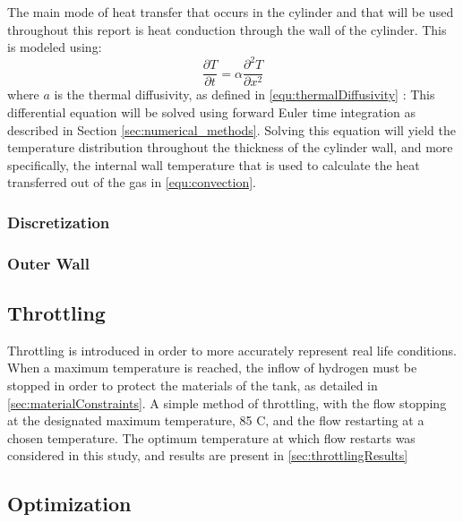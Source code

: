 The main mode of heat transfer that occurs in the cylinder and that will be used throughout this report is heat conduction through the wall of the cylinder. This is modeled using:
\begin{equation}
\frac{\partial T}{\partial t} = \alpha \frac{\partial^2 T }{\partial x^2}
\end{equation}
where $a$ is the thermal diffusivity, as defined in \cref{equ:thermalDiffusivity} :
This differential equation will be solved using forward Euler time integration as described in Section \ref{sec:numerical_methods}. Solving this equation will yield the temperature distribution throughout the thickness of the cylinder wall, and more specifically, the internal wall temperature that is used to calculate the heat transferred out of the gas in \cref{equ:convection}.

\subsubsection{Discretization}


\subsubsection{Outer Wall}




\subsection{Throttling}

Throttling is introduced in order to more accurately represent real life conditions. When a maximum temperature is reached, the inflow of hydrogen must be stopped in order to protect the materials of the tank, as detailed in \cref{sec:materialConstraints}. A simple method of throttling, with the flow stopping at the designated maximum temperature, 85 \degree C, and the flow restarting at a chosen temperature. The optimum temperature at which flow restarts was considered in this study, and results are present in \cref{sec:throttlingResults}


\subsection{Optimization}

